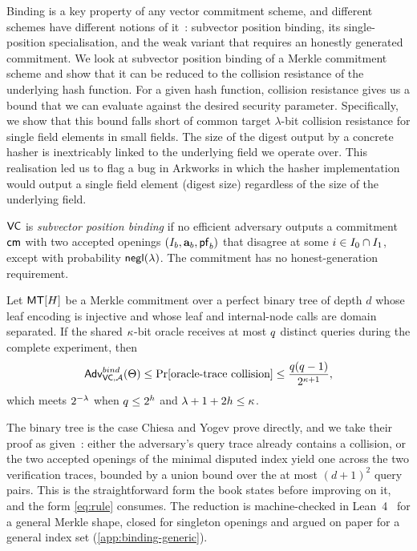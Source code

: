 \label{sec:binding}
Binding is a key property of any vector commitment scheme, and different schemes have
different notions of it~\cite{CY26}: subvector position binding, its single-position
specialisation, and the weak variant that requires an honestly generated commitment. We
look at subvector position binding of a Merkle commitment scheme and show that it can be
reduced to the collision resistance of the underlying hash function. For a given hash
function, collision resistance gives us a bound that we can evaluate against the desired
security parameter. Specifically, we show that this bound falls short of common target
$\lambda$-bit collision resistance for single field elements in small fields. The size of
the digest output by a concrete hasher is inextricably linked to the underlying field we
operate over. This realisation led us to flag a bug in Arkworks in which the hasher
implementation would output a single field element (digest size) regardless of the size of
the underlying field.

\begin{definition}\label{def:vc-binding}
$\mathsf{VC}$ is \emph{subvector position binding} if no efficient adversary outputs a commitment
$\mathsf{cm}$ with two accepted openings
$(I_b,\mathbf{a}_b,\mathsf{pf}_b)$ that disagree at some
$i\in I_0\cap I_1$, except with probability $\mathsf{negl}(\lambda)$.  The commitment
has no honest-generation requirement.
\end{definition}

\begin{proposition}\label{thm:binding-cr}
Let $\mathsf{MT}[H]$ be a Merkle commitment over a perfect binary tree of depth $d$ whose leaf
encoding is injective and whose leaf and internal-node calls are domain separated.  If
the shared $\kappa$-bit oracle receives at most $q$ distinct
queries during the complete experiment, then
\[
  \mathsf{Adv}^{bind}_{\mathsf{VC},\mathcal{A}}(\Theta)
  \le \Pr[\text{oracle-trace collision}]
  \le \frac{q(q-1)}{2^{\kappa+1}},
\]
which meets $2^{-\lambda}$ when $q\le2^{h}$ and
$\lambda+1+2h\le\kappa$.
\end{proposition}

The binary tree is the case Chiesa and Yogev prove directly, and we take their proof as
given~\cite{CY26}: either the adversary's query trace already contains a collision, or the
two accepted openings of the minimal disputed index yield one across the two verification
traces, bounded by a union bound over the at most $(d+1)^2$ query pairs.  This is the
straightforward form the book states before improving on it, and the form \cref{eq:rule}
consumes.  The reduction is machine-checked in Lean~4~\cite{ZLeanVC26} for a general Merkle
shape, closed for singleton openings and argued on paper for a general index set
(\cref{app:binding-generic}).

